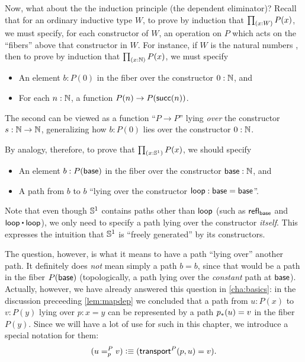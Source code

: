 %
Now, what about the the induction principle (the dependent eliminator)?
Recall that for an ordinary inductive type $W$, to prove by induction that $\prd{x:W} P(x)$, we must specify, for each constructor of $W$, an operation on $P$ which acts on the ``fibers'' above that constructor in $W$.
For instance, if $W$ is the natural numbers \nat, then to prove by induction that $\prd{x:\nat} P(x)$, we must specify
\begin{itemize}
\item An element $b:P(0)$ in the fiber over the constructor $0:\mathbb{N}$, and
\item For each $n:\mathbb{N}$, a function $P(n) \to P(\mathsf{succ}(n))$.
\end{itemize}
The second can be viewed as a function ``$P\to P$'' lying \emph{over} the constructor $s:\mathbb{N}\to\mathbb{N}$, generalizing how $b:P(0)$ lies over the constructor $0:\mathbb{N}$.

By analogy, therefore, to prove that $\prd{x:\Sn^1} P(x)$, we should specify
\begin{itemize}
\item An element $b:P(\mathsf{base})$ in the fiber over the constructor $\mathsf{base}:\mathbb{N}$, and
\item A path from $b$ to $b$ ``lying over the constructor $\mathsf{loop}:\mathsf{base}=\mathsf{base}$''.
\end{itemize}
Note that even though $\mathbb{S}^1$ contains paths other than $\mathsf{loop}$ (such as $\mathsf{refl}_{\mathsf{base}}$ and $\lloop\ct\lloop$), we only need to specify a path lying over the constructor \emph{itself}.
This expresses the intuition that $\mathbb{S}^1$ is ``freely generated'' by its constructors.

The question, however, is what it means to have a path ``lying over'' another path.
It definitely does \emph{not} mean simply a path $b=b$, since that would be a path in the fiber $P(\mathsf{base})$ (topologically, a path lying over the \emph{constant} path at $\mathsf{base}$).
Actually, however, we have already answered this question in \autoref{cha:basics}: in the discussion preceeding \autoref{lem:mapdep} we concluded that a path from $u:P(x)$ to $v:P(y)$ lying over $p:x=y$ can be represented by a path ${p}_{*}\mathopen{}\left({u}\right)\mathclose{} = v$ in the fiber $P(y)$.
Since we will have a lot of use for such 
%
in this chapter, we introduce a special notation for them:
\begin{equation}
  (\dpath P p u v) \defeq (\transfib{P} p u = v).\label{eq:dpath}
\end{equation}

